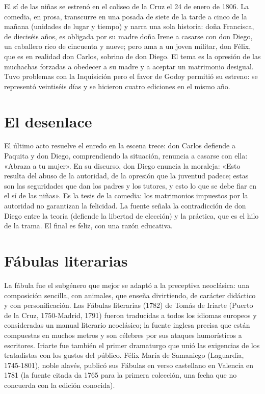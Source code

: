 \documentclass{book}
\begin{document}
El sí de las niñas se estrenó en el coliseo de la Cruz el 24 de enero de 1806. La comedia, en prosa, transcurre en una posada de siete de la tarde a cinco de la mañana (unidades de lugar y tiempo) y narra una sola historia: doña Francisca, de dieciséis años, es obligada por su madre doña Irene a casarse con don Diego, un caballero rico de cincuenta y nueve; pero ama a un joven militar, don Félix, que es en realidad don Carlos, sobrino de don Diego. El tema es la opresión de las muchachas forzadas a obedecer a su madre y a aceptar un matrimonio desigual. Tuvo problemas con la Inquisición pero el favor de Godoy permitió su estreno: se representó veintiséis días y se hicieron cuatro ediciones en el mismo año.


\section{El desenlace}

El último acto resuelve el enredo en la escena trece: don Carlos defiende a Paquita y don Diego, comprendiendo la situación, renuncia a casarse con ella: «Abraza a tu mujer». En su discurso, don Diego enuncia la moraleja: «Esto resulta del abuso de la autoridad, de la opresión que la juventud padece; estas son las seguridades que dan los padres y los tutores, y esto lo que se debe fiar en el sí de las niñas». Es la tesis de la comedia: los matrimonios impuestos por la autoridad no garantizan la felicidad. La fuente señala la contradicción de don Diego entre la teoría (defiende la libertad de elección) y la práctica, que es el hilo de la trama. El final es feliz, con una razón educativa.


\section{Fábulas literarias}

La fábula fue el subgénero que mejor se adaptó a la preceptiva neoclásica: una composición sencilla, con animales, que enseña divirtiendo, de carácter didáctico y con personificación. Las Fábulas literarias (1782) de Tomás de Iriarte (Puerto de la Cruz, 1750-Madrid, 1791) fueron traducidas a todos los idiomas europeos y consideradas un manual literario neoclásico; la fuente inglesa precisa que están compuestas en muchos metros y son célebres por sus ataques humorísticos a escritores. Iriarte fue también el primer dramaturgo que unió las exigencias de los tratadistas con los gustos del público. Félix María de Samaniego (Laguardia, 1745-1801), noble alavés, publicó sus Fábulas en verso castellano en Valencia en 1781 (la fuente citada da 1765 para la primera colección, una fecha que no concuerda con la edición conocida).
\end{document}
